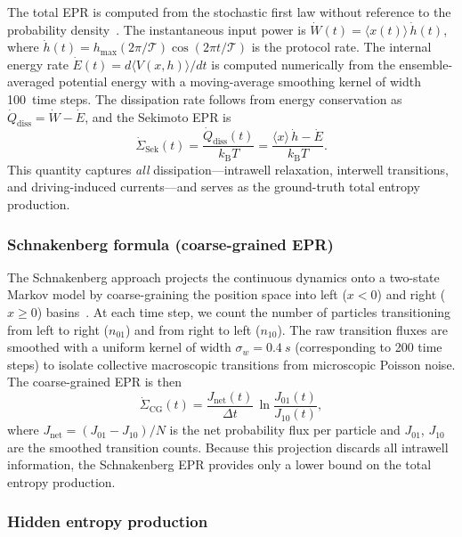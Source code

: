 The total EPR is computed from the stochastic first law without reference to the probability density~\cite{Sekimoto2010}.
The instantaneous input power is $\dot{W}(t) = \langle x(t)\rangle\,\dot{h}(t)$, where
$\dot{h}(t) = h_{\max}(2\pi/\mathcal{T})\cos(2\pi t/\mathcal{T})$ is the protocol rate.
The internal energy rate $\dot{E}(t) = d\langle V(x,h)\rangle/dt$ is computed numerically from the ensemble-averaged potential energy with a moving-average smoothing kernel of width \num{100}~time steps.
The dissipation rate follows from energy conservation as $\dot{Q}_{\mathrm{diss}} = \dot{W} - \dot{E}$, and the Sekimoto EPR is
\begin{equation}
    \dot{\Sigma}_{\mathrm{Sek}}(t) = \frac{\dot{Q}_{\mathrm{diss}}(t)}{k_{\mathrm{B}}T} = \frac{\langle x\rangle\,\dot{h} - \dot{E}}{k_{\mathrm{B}}T}.
    \label{eq:epr_sekimoto}
\end{equation}
This quantity captures \emph{all} dissipation---intrawell relaxation, interwell transitions, and driving-induced currents---and serves as the ground-truth total entropy production.

\subsubsection{Schnakenberg formula (coarse-grained EPR)}
\label{sec:schnakenberg}

The Schnakenberg approach projects the continuous dynamics onto a two-state Markov model by coarse-graining the position space into left ($x < 0$) and right ($x \geq 0$) basins~\cite{Schnakenberg1976}.
At each time step, we count the number of particles transitioning from left to right ($n_{01}$) and from right to left ($n_{10}$).
The raw transition fluxes are smoothed with a uniform kernel of width $\sigma_w = \SI{0.4}{s}$ (corresponding to \num{200} time steps) to isolate collective macroscopic transitions from microscopic Poisson noise.
The coarse-grained EPR is then
\begin{equation}
    \dot{\Sigma}_{\mathrm{CG}}(t) = \frac{J_{\mathrm{net}}(t)}{\Delta t}\,\ln\frac{J_{01}(t)}{J_{10}(t)},
    \label{eq:epr_schnakenberg}
\end{equation}
where $J_{\mathrm{net}} = (J_{01} - J_{10})/N$ is the net probability flux per particle and $J_{01}$, $J_{10}$ are the smoothed transition counts.
Because this projection discards all intrawell information, the Schnakenberg EPR provides only a lower bound on the total entropy production.

\subsubsection{Hidden entropy production}
\label{sec:hidden_entropy}

